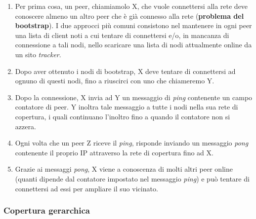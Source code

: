 \begin{enumerate}
\def\labelenumi{\arabic{enumi}.}
\item
  Per prima cosa, un peer, chiamiamolo X, che vuole connettersi alla   rete deve conoscere almeno un altro peer che è già connesso alla rete   (\textbf{problema del bootstrap}). I due approcci più comuni   consistono nel mantenere in ogni peer una lista di client noti a cui   tentare di connettersi e/o, in mancanza di connessione a tali nodi,   nello scaricare una lista di nodi attualmente online da un sito
  \emph{tracker}.
\item
  Dopo aver ottenuto i nodi di bootstrap, X deve tentare di connettersi   ad ognuno di questi nodi, fino a riuscirci con uno che chiameremo Y.
\item
  Dopo la connessione, X invia ad Y un messaggio di \emph{ping}   contenente un campo contatore di peer. Y inoltra tale messaggio a   tutte i nodi nella sua rete di copertura, i quali continuano l'inoltro   fino a quando il contatore non si azzera.
\item
  Ogni volta che un peer Z riceve il \emph{ping}, risponde inviando un   messaggio \emph{pong} contenente il proprio IP attraverso la rete di   copertura fino ad X.
\item
  Grazie ai messaggi \emph{pong}, X viene a conoscenza di molti altri   peer online (quanti dipende dal contatore impostato nel messaggio   \emph{ping}) e può tentare di connettersi ad essi per ampliare il suo   vicinato.
\end{enumerate}

\subsubsection{Copertura gerarchica}\label{copertura-gerarchica}

